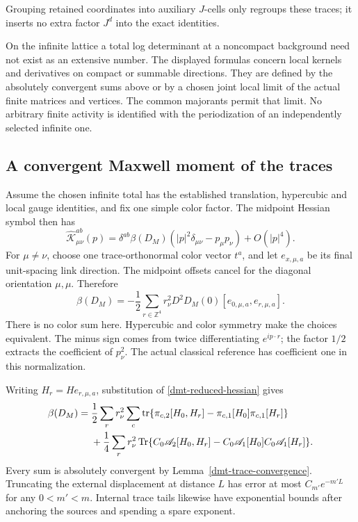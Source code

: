 \documentclass[11pt]{article}
\theoremstyle{remark}
\begin{document}
Grouping retained coordinates into auxiliary \(J\)-cells
only regroups these traces; it inserts no extra factor
\(J^d\) into the exact identities.

On the infinite lattice a total log determinant at a
noncompact background need not exist as an extensive
number. The displayed formulas concern local kernels
and derivatives on compact or summable directions.
They are defined by the absolutely convergent sums above
or by a chosen joint local limit of the actual finite
matrices and vertices. The common majorants permit that
limit. No arbitrary finite activity is identified with
the periodization of an independently selected infinite
one.

\subsection{A convergent Maxwell moment of the traces}
\label{dmt-Maxwell-section}

Assume the chosen infinite total has the established
translation, hypercubic and local gauge identities, and
fix one simple color factor. The midpoint Hessian symbol
then has
\begin{equation}
 \widehat{\mathcal K}_{\mu\nu}^{ab}(p)
 =\delta^{ab}\beta(D_M)
       (|p|^2\delta_{\mu\nu}-p_\mu p_\nu)+O(|p|^4).
 \label{dmt-Maxwell-symbol}
\end{equation}
For \(\mu\ne\nu\), choose one trace-orthonormal color
vector \(t^a\), and let \(e_{x,\mu,a}\) be its final
unit-spacing link direction. The midpoint offsets
cancel for the diagonal orientation \(\mu,\mu\).
Therefore
\begin{equation}
 \boxed{\displaystyle
 \beta(D_M)=-\frac12\sum_{r\in\mathbb Z^4}r_\nu^2
       D^2D_M(0)[e_{0,\mu,a},e_{r,\mu,a}].}
 \label{dmt-Maxwell-moment}
\end{equation}
There is no color sum here. Hypercubic and color symmetry
make the choices equivalent. The minus sign comes from
twice differentiating \(e^{ip\cdot r}\); the factor
\(1/2\) extracts the coefficient of \(p_\nu^2\).
The actual classical reference has coefficient one in
this normalization.

Writing \(H_r=H e_{r,\mu,a}\), substitution of
\eqref{dmt-reduced-hessian} gives
\begin{align}
 \beta(D_M)
 ={}&\frac12\sum_r r_\nu^2\sum_c\operatorname{tr}
 \{\pi_{c,2}[H_0,H_r]
       -\pi_{c,1}[H_0]\pi_{c,1}[H_r]\}\notag\\
 &+\frac14\sum_r r_\nu^2\operatorname{Tr}
 \{C_0\mathscr A_2[H_0,H_r]
       -C_0\mathscr A_1[H_0]C_0\mathscr A_1[H_r]\}.
 \label{dmt-explicit-Maxwell-trace}
\end{align}
Every sum is absolutely convergent by
Lemma~\ref{dmt-trace-convergence}. Truncating the external
displacement at distance \(L\) has error at most
\(C_{m'}e^{-m'L}\) for any \(0<m'<m\).
Internal trace tails likewise have exponential bounds
after anchoring the sources and spending a spare exponent.
\end{document}
